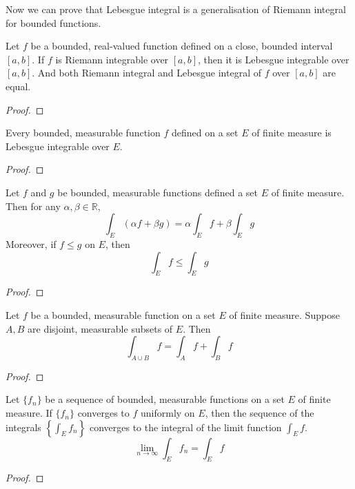 Now we can prove that Lebesgue integral is a generalisation of Riemann integral for bounded functions.
\begin{theorem}
	Let $f$ be a bounded, real-valued function defined on a close, bounded interval $[a,b]$.
	If $f$ is Riemann integrable over $[a,b]$, then it is Lebesgue integrable over $[a,b]$.
	And both Riemann integral and Lebesgue integral of $f$ over $[a,b]$ are equal.
\end{theorem}
\begin{proof}
\end{proof}

\begin{theorem}
	Every bounded, measurable function $f$ defined on a set $E$ of finite measure is Lebesgue integrable over $E$.
\end{theorem}
\begin{proof}
\end{proof}
\begin{theorem}
	Let $f$ and $g$ be bounded, measurable functions defined a set $E$ of finite measure.
	Then for any $\alpha,\beta \in \mathbb{R}$,
	\begin{equation}
		\int_E (\alpha f + \beta g) = \alpha \int_E f + \beta \int_E g
	\end{equation}
	Moreover, if $f \le g$ on $E$, then
	\begin{equation}
		\int_E f \le \int_E g
	\end{equation}

\end{theorem}
\begin{proof}
\end{proof}

\begin{theorem}
	Let $f$ be a bounded, measurable function on a set $E$ of finite measure.
	Suppose $A,B$ are disjoint, measurable subsets of $E$. Then
	\begin{equation}
		\int_{A \cup B} f = \int_A f + \int_B f
	\end{equation}
\end{theorem}
\begin{proof}
\end{proof}

\begin{theorem}
	Let $\{ f_n \}$ be a sequence of bounded, measurable functions on a set $E$ of finite measure.
	If $\{ f_n \}$ converges to $f$ uniformly on $E$, then the sequence of the integrals $\left\{ \int_E f_n \right\}$ converges to the integral of the limit function $\int_E f$.
	\begin{equation}
		\lim_{n \to \infty} \int_E f_n = \int_E f
	\end{equation}
\end{theorem}
\begin{proof}
\end{proof}

